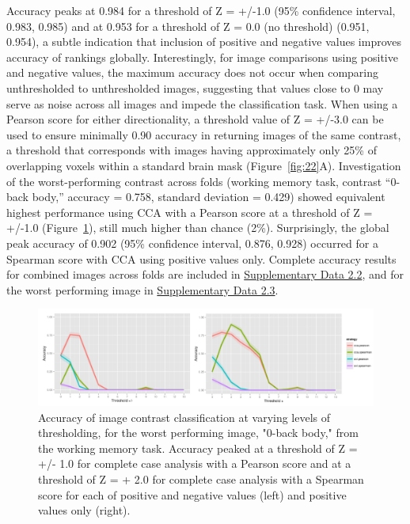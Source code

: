 \documentclass{report}
\begin{document}
Accuracy peaks at 0.984 for a threshold of Z = +/-1.0 (95\% confidence
interval, 0.983, 0.985) and at 0.953 for a threshold of Z = 0.0 (no
threshold) (0.951, 0.954), a subtle indication that inclusion of
positive and negative values improves accuracy of rankings globally.
Interestingly, for image comparisons using positive and negative values,
the maximum accuracy does not occur when comparing unthresholded to
unthresholded images, suggesting that values close to 0 may serve as
noise across all images and impede the classification task. When using a
Pearson score for either directionality, a threshold value of Z = +/-3.0
can be used to ensure minimally 0.90 accuracy in returning images of the
same contrast, a threshold that corresponds with images having
approximately only 25\% of overlapping voxels within a standard brain
mask (Figure~\ref{fig:22}A). Investigation of the worst-performing contrast across
folds (working memory task, contrast ``0-back body,'' accuracy = 0.758,
standard deviation = 0.429) showed equivalent highest performance using
CCA with a Pearson score at a threshold of Z = +/-1.0 (Figure~\ref{fig:24}), still
much higher than chance (2\%). Surprisingly, the global peak accuracy of
0.902 (95\% confidence interval, 0.876, 0.928) occurred for a Spearman
score with CCA using positive values only. Complete accuracy results for
combined images across folds are included in \href{https://github.com/vsoch/thesis/blob/master/supplementary/chapter2/supp_data2_ml_accuracy.csv}{Supplementary Data 2.2}, and
for the worst performing image in \href{https://github.com/vsoch/thesis/blob/master/supplementary/chapter2/supp_data3_ml_accuracy_TASK07_CON35.csv}{Supplementary Data 2.3}.

\begin{figure}[ht!]
\begin{center}
\includegraphics[width=15cm]{images/figure24.png}
\end{center}
 \caption{\label{fig:24} Accuracy of image contrast classification at varying levels of thresholding, for the worst performing image, "0-back body," from the working memory task. Accuracy peaked at a threshold of Z = +/- 1.0 for complete case analysis with a Pearson score and at a threshold of Z = + 2.0 for complete case analysis with a Spearman score for each of positive and negative values (left) and positive values only (right).}
\end{figure}
\end{document}
